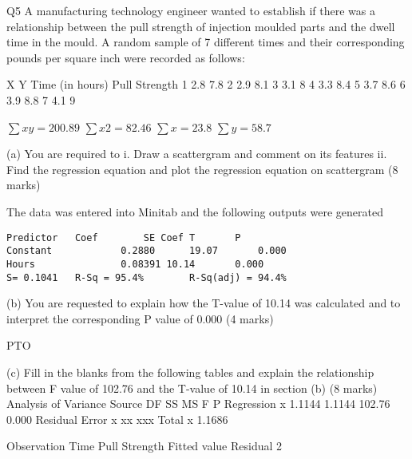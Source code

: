 
Q5
A manufacturing technology engineer wanted to establish if there was a relationship between the pull strength of injection moulded parts and the dwell time in the mould. A random sample of 7 different times and their corresponding pounds per square inch were recorded as follows:


X	Y
Time (in hours)	Pull Strength
1	2.8	7.8
2	2.9	8.1
3	3.1	8
4	3.3	8.4
5	3.7	8.6
6	3.9	8.8
7	4.1	9

$\sum xy =	200.89$	 $\sum x2 = 	82.46$	 $\sum x = 23.8$	$\sum y = 58.7$

(a) 	You are required to 
i.	Draw a scattergram and comment on its features
ii.	Find the regression equation and plot the regression equation on scattergram
(8 marks)

The data was entered into Minitab and the following outputs were generated

\begin{framed}
\begin{verbatim}
Predictor	Coef		SE Coef	T		P
Constant			0.2880		19.07		0.000
Hours				0.08391	10.14		0.000
S= 0.1041	R-Sq = 95.4%		R-Sq(adj) = 94.4%
\end{verbatim}
\end{framed}

(b) 	You are requested to explain how the T-value of 10.14 was calculated and to 
interpret the corresponding P value of 0.000
(4 marks)

PTO


(c)	Fill in the blanks from the following tables and explain the relationship between F value of 102.76 and the T-value of 10.14 in section (b)
(8 marks)
Analysis of Variance
Source			DF		SS		MS		F		P
Regression		x		1.1144		1.1144		102.76		0.000
Residual Error		x		xx		xxx		
Total			x		1.1686



Observation		Time		Pull Strength		Fitted value	Residual
2		
